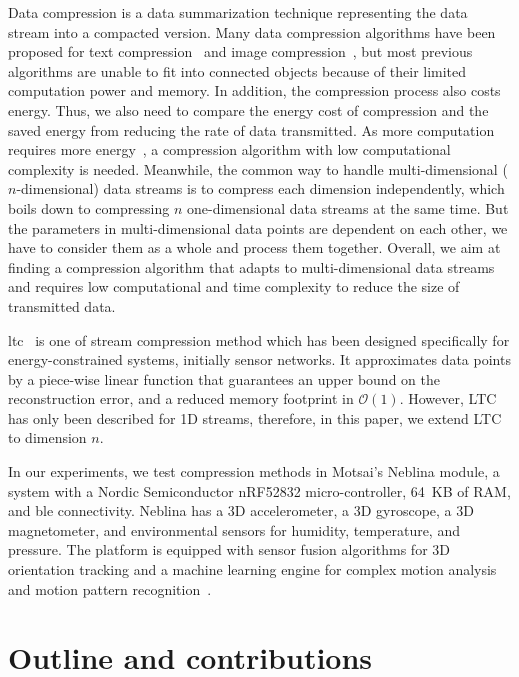 Data compression is a data summarization technique representing the data stream
into a compacted version. Many data compression algorithms have been proposed
for text compression~\cite{shanmugasundaram2011comparative,
sayood2017introduction} and image compression~\cite{shum2003survey,
zaineldin2015image}, but most previous algorithms are unable to fit into
connected objects because of their limited computation power and memory. In
addition, the compression process also costs energy. Thus, we also need to
compare the energy cost of compression and the saved energy from reducing the
rate of data transmitted. As more computation requires more
energy~\cite{pope2018accelerometer}, a compression algorithm with low
computational complexity is needed. Meanwhile, the common way to handle
multi-dimensional ($n$-dimensional) data streams is to compress each dimension
independently, which boils down to compressing $n$ one-dimensional data streams
at the same time. But the parameters in multi-dimensional data points are
dependent on each other, we have to consider them as a whole and process them
together. Overall, we aim at finding a compression algorithm that adapts to
multi-dimensional data streams and requires low computational and time
complexity to reduce the size of transmitted data.

\acrfull{ltc}~\cite{schoellhammer2004lightweight} is one of stream compression
method which has been designed specifically for energy-constrained systems,
initially sensor networks. It approximates data points by a piece-wise linear
function that guarantees an upper bound on the reconstruction error, and a
reduced memory footprint in $\mathcal{O}(1)$. However, LTC has only been
described for 1D streams, therefore, in this paper, we extend LTC to dimension
$n$.


In our experiments, we test compression methods in Motsai's Neblina module, a
system with a Nordic Semiconductor nRF52832 micro-controller, 64~KB of RAM, and
\acrlong{ble} connectivity. Neblina has a 3D accelerometer, a 3D gyroscope, a 3D
magnetometer, and environmental sensors for humidity, temperature, and pressure.
The platform is equipped with sensor fusion algorithms for 3D orientation
tracking and a machine learning engine for complex motion analysis and motion
pattern recognition~\cite{sarbishei2016accuracy}.


\section{Outline and contributions}

